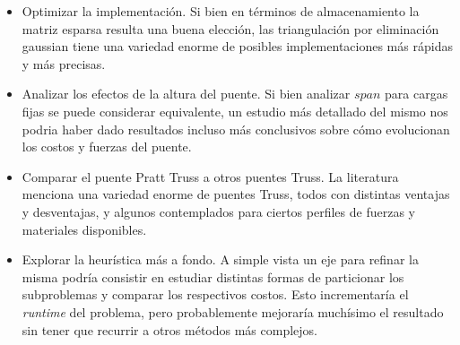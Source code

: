 \begin{itemize}
\item Optimizar la implementación. Si bien en términos de almacenamiento la matriz esparsa resulta una buena elección, las triangulación por eliminación gaussian tiene una variedad enorme de posibles implementaciones más rápidas y más precisas.
\item Analizar los efectos de la altura del puente. Si bien analizar $span$ para cargas fijas se puede considerar equivalente, un estudio más detallado del mismo nos podria haber dado resultados incluso más conclusivos sobre cómo evolucionan los costos y fuerzas del puente.
\item Comparar el puente Pratt Truss a otros puentes Truss. La literatura menciona una variedad enorme de puentes Truss, todos con distintas ventajas y desventajas, y algunos contemplados para ciertos perfiles de fuerzas y materiales disponibles.
\item Explorar la heurística más a fondo. A simple vista un eje para refinar la misma podría consistir en estudiar distintas formas de particionar los subproblemas y comparar los respectivos costos. Esto incrementaría el \textit{runtime} del problema, pero probablemente mejoraría muchísimo el resultado sin tener que recurrir a otros métodos más complejos.
\end{itemize}
